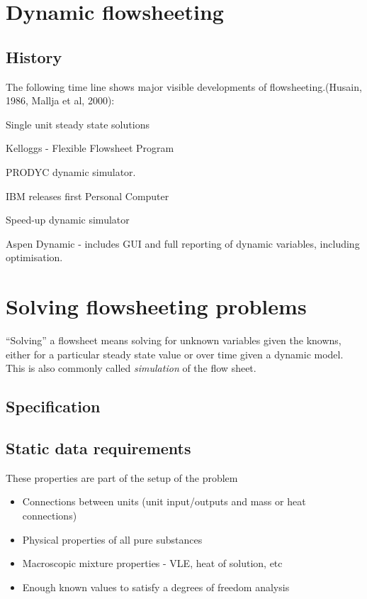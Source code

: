 \section{Dynamic flowsheeting}
\subsection{History}
The following time line shows major visible developments of
flowsheeting.(Husain, 1986, Mallja et al, 2000):
\begin{description}
\item 
\item[1955] Single unit steady state solutions 
\item[1958] Kelloggs - Flexible Flowsheet Program 
\item[1965] PRODYC dynamic simulator. 
\item[1970] IBM releases  first Personal Computer 
\item[1982] Speed-up dynamic simulator 
\item[1995] Aspen  Dynamic - includes GUI and full reporting of dynamic variables, including optimisation.
\end{description}

\section{Solving flowsheeting problems}
``Solving'' a flowsheet means solving for unknown variables given the knowns, either for a particular steady state value or over time given a dynamic model.  
This is also commonly called \emph{simulation} of the flow sheet.

\subsection{Specification}
\subsection{Static data requirements}
These properties are part of the setup of the problem
\begin{itemize}
\item Connections between units (unit input/outputs and mass or heat connections)
\item Physical properties of all pure substances
\item Macroscopic mixture properties - VLE, heat of solution, etc
\item Enough known values to satisfy a degrees of freedom analysis
\end{itemize}

